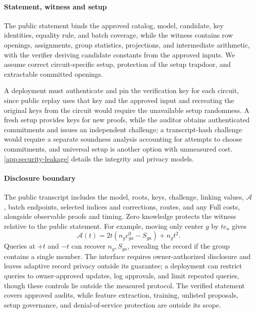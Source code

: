 \documentclass[5p,times,twocolumn]{elsarticle}
\begin{document}
\paragraph{Statement, witness and setup}
The public statement binds the approved catalog, model, candidate, key identities, equality rule, and batch coverage, while the witness contains row openings, assignments, group statistics, projections, and intermediate arithmetic, with the verifier deriving candidate constants from the approved inputs. We assume correct circuit-specific setup, protection of the setup trapdoor, and extractable committed openings.

A deployment must authenticate and pin the verification key for each circuit, since public replay uses that key and the approved input and recreating the original keys from the circuit would require the unavailable setup randomness. A fresh setup provides keys for new proofs, while the auditor obtains authenticated commitments and issues an independent challenge; a transcript-hash challenge would require a separate soundness analysis accounting for attempts to choose commitments, and universal setup is another option with unmeasured cost. \ref{app:security-leakage} details the integrity and privacy models.

\paragraph{Disclosure boundary}
The public transcript includes the model, roots, keys, challenge, linking values, $\mathcal A$, batch endpoints, selected indices and corrections, routes, and any Full costs, alongside observable proofs and timing. Zero knowledge protects the witness relative to the public statement. For example, moving only center $g$ by $te_a$ gives
\begin{equation}
 \mathcal A(t)=2t(n_gc^0_{ga}-S_{ga})+n_gt^2.
 \label{eq:methodology-leakage}
\end{equation}
Queries at $+t$ and $-t$ can recover $n_g,S_{ga}$, revealing the record if the group contains a single member. The interface requires owner-authorized disclosure and leaves adaptive record privacy outside its guarantee; a deployment can restrict queries to owner-approved updates, log approvals, and limit repeated queries, though these controls lie outside the measured protocol. The verified statement covers approved audits, while feature extraction, training, unlisted proposals, setup governance, and denial-of-service protection are outside its scope.
\end{document}
